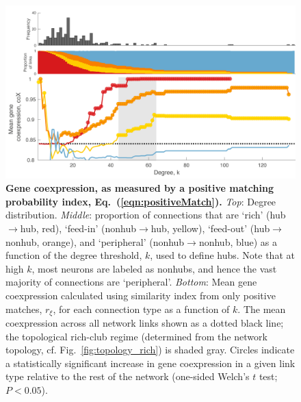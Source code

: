 \documentclass[10pt,letterpaper]{article}
\begin{document}
\begin{figure}[!h]
\label{RFPposmatches}
\centering
    \includegraphics[width=1\textwidth]{meanCoexpressionCoXALL.pdf}
\caption{
\textbf{Gene coexpression, as measured by a positive matching probability index, Eq.~(\ref{eqn:positiveMatch}).}
\emph{Top}: Degree distribution.
\emph{Middle}: proportion of connections that are `rich' (hub$\rightarrow$hub, red), `feed-in' (nonhub$\rightarrow$hub, yellow), `feed-out' (hub$\rightarrow$nonhub, orange), and `peripheral' (nonhub$\rightarrow$nonhub, blue) as a function of the degree threshold, $k$, used to define hubs.
Note that at high $k$, most neurons are labeled as nonhubs, and hence the vast majority of connections are `peripheral'.
\emph{Bottom}: Mean gene coexpression calculated using similarity index from only positive matches, $r_\xi$, for each connection type as a function of $k$.
The mean coexpression across all network links shown as a dotted black line; the topological rich-club regime (determined from the network topology, cf. Fig.~\ref{fig:topology_rich}) is shaded gray.
Circles indicate a statistically significant increase in gene coexpression in a given link type relative to the rest of the network (one-sided Welch's $t$ test; $P < 0.05$).
}
\end{figure}
\end{document}
